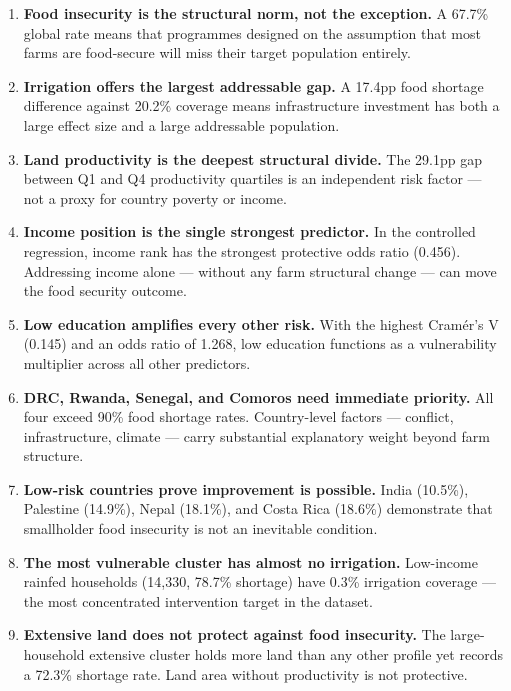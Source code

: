\documentclass[11pt,a4paper]{article}
\begin{document}
\begin{enumerate}

  \item \textbf{Food insecurity is the structural norm, not the exception.} A 67.7\% global rate means that programmes designed on the assumption that most farms are food-secure will miss their target population entirely.

  \item \textbf{Irrigation offers the largest addressable gap.} A 17.4pp food shortage difference against 20.2\% coverage means infrastructure investment has both a large effect size and a large addressable population.

  \item \textbf{Land productivity is the deepest structural divide.} The 29.1pp gap between Q1 and Q4 productivity quartiles is an independent risk factor — not a proxy for country poverty or income.

  \item \textbf{Income position is the single strongest predictor.} In the controlled regression, income rank has the strongest protective odds ratio (0.456). Addressing income alone — without any farm structural change — can move the food security outcome.

  \item \textbf{Low education amplifies every other risk.} With the highest Cramér's V (0.145) and an odds ratio of 1.268, low education functions as a vulnerability multiplier across all other predictors.

  \item \textbf{DRC, Rwanda, Senegal, and Comoros need immediate priority.} All four exceed 90\% food shortage rates. Country-level factors — conflict, infrastructure, climate — carry substantial explanatory weight beyond farm structure.

  \item \textbf{Low-risk countries prove improvement is possible.} India (10.5\%), Palestine (14.9\%), Nepal (18.1\%), and Costa Rica (18.6\%) demonstrate that smallholder food insecurity is not an inevitable condition.

  \item \textbf{The most vulnerable cluster has almost no irrigation.} Low-income rainfed households (14,330, 78.7\% shortage) have 0.3\% irrigation coverage — the most concentrated intervention target in the dataset.

  \item \textbf{Extensive land does not protect against food insecurity.} The large-household extensive cluster holds more land than any other profile yet records a 72.3\% shortage rate. Land area without productivity is not protective.


\end{enumerate}
\end{document}
